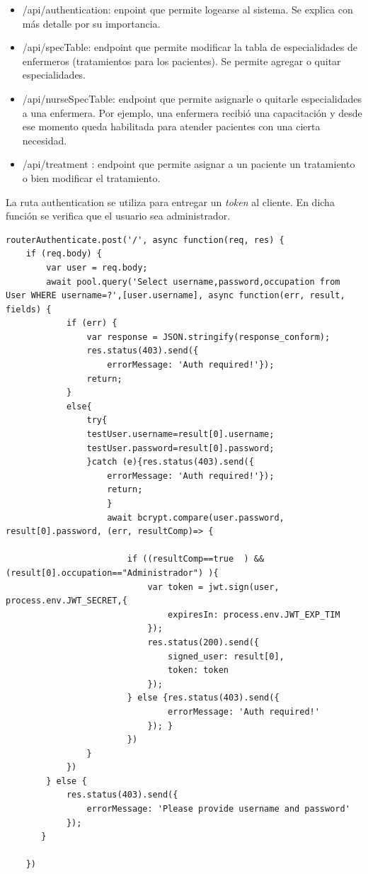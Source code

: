 \begin{itemize}
\item /api/authentication: enpoint que permite logearse al sistema. Se explica con más detalle por su importancia.
\item /api/specTable: endpoint que permite modificar la tabla de especialidades de enfermeros (tratamientos para los pacientes). Se permite agregar o quitar especialidades.
\item /api/nurseSpecTable: endpoint que permite asignarle o quitarle especialidades a una enfermera. Por ejemplo, una enfermera recibió una capacitación y desde ese momento queda habilitada para atender pacientes con una cierta necesidad.
\item /api/treatment : endpoint que permite asignar a  un paciente un tratamiento o bien modificar el tratamiento.

\end{itemize}

La ruta authentication se utiliza para entregar un \textit{token} al cliente. En dicha función se verifica que el usuario sea administrador.

\begin{lstlisting}[label=cod:Logueo Web,caption=  Logueo web.]
routerAuthenticate.post('/', async function(req, res) {
    if (req.body) {
        var user = req.body;
        await pool.query('Select username,password,occupation from User WHERE username=?',[user.username], async function(err, result, fields) {
            if (err) {
                var response = JSON.stringify(response_conform);
                res.status(403).send({
                    errorMessage: 'Auth required!'});
                return;    
            }
            else{
                try{
                testUser.username=result[0].username;
                testUser.password=result[0].password;
                }catch (e){res.status(403).send({
                    errorMessage: 'Auth required!'});
                    return;    
                    }
                    await bcrypt.compare(user.password, result[0].password, (err, resultComp)=> {

                        if ((resultComp==true  ) &&(result[0].occupation=="Administrador") ){
                            var token = jwt.sign(user, process.env.JWT_SECRET,{
                                expiresIn: process.env.JWT_EXP_TIM
                            });
                            res.status(200).send({
                                signed_user: result[0],
                                token: token
                            });
                        } else {res.status(403).send({
                                errorMessage: 'Auth required!'
                            }); }
                        })                    
                }      
            }) 
        } else {
            res.status(403).send({
                errorMessage: 'Please provide username and password'
            });
       }

    })

\end{lstlisting}

